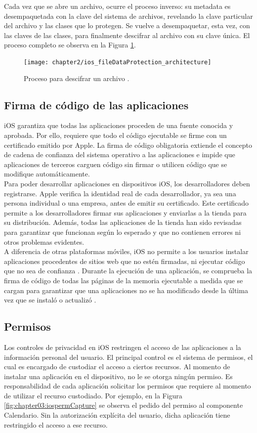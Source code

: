 Cada vez que se abre un archivo, ocurre el proceso inverso: su metadata es desempaquetada con la clave del sistema de archivos, revelando la clave particular del archivo y las clases que lo protegen. Se vuelve a desempaquetar, esta vez, con las claves de las clases, para finalmente descifrar al archivo con su clave única. El proceso completo se observa en la Figura \ref{fig:ch02:dataProtection}.
\begin{figure}[hbtp]
    \centering
    \texttt{[image: chapter2/ios\_fileDataProtection\_architecture]}
    \caption{Proceso para descifrar un archivo \cite{asg}.}
    \label{fig:ch02:dataProtection}
\end{figure}
\subsection{Firma de código de las aplicaciones}
iOS garantiza que todas las aplicaciones proceden de una fuente conocida y aprobada. Por ello, requiere que todo el código ejecutable se firme con un certificado emitido por Apple. La firma de código obligatoria extiende el concepto de cadena de confianza del sistema operativo a las aplicaciones e impide que aplicaciones de terceros carguen código sin firmar o utilicen código que se modifique automáticamente.\\

Para poder desarrollar aplicaciones en dispositivos iOS, los desarrolladores deben registrarse. Apple verifica la identidad real de cada desarrollador, ya sea una persona individual o una empresa, antes de emitir su certificado. Este certificado permite a los desarrolladores firmar sus aplicaciones y enviarlas a la tienda para su distribución. Además, todas las aplicaciones de la tienda han sido revisadas para garantizar que funcionan según lo esperado y que no contienen errores ni otros problemas evidentes.\\

A diferencia de otras plataformas móviles, iOS no permite a los usuarios instalar aplicaciones procedentes de sitios web que no estén firmadas, ni ejecutar código que no sea de confianza \cite{asg}. Durante la ejecución de una aplicación, se comprueba la firma de código de todas las páginas de la memoria ejecutable a medida que se cargan para garantizar que una aplicaciones no se ha modificado desde la última vez que se instaló o actualizó \cite{asg}.
\subsection{Permisos}
Los controles de privacidad en iOS restringen el acceso de las aplicaciones a la información personal del usuario. El principal control es el sistema de permisos, el cual es encargado de custodiar el acceso a ciertos recursos. Al momento de instalar una aplicación en el dispositivo, no le se otorga ningún permiso. Es responsabilidad de cada aplicación solicitar los permisos que requiere al momento de utilizar el recurso custodiado. Por ejemplo, en la Figura \ref{fig:chapter03:iospermCapture} se observa el pedido del permiso al componente Calendario. Sin la autorización explícita del usuario, dicha aplicación tiene restringido el acceso a ese recurso.\\

